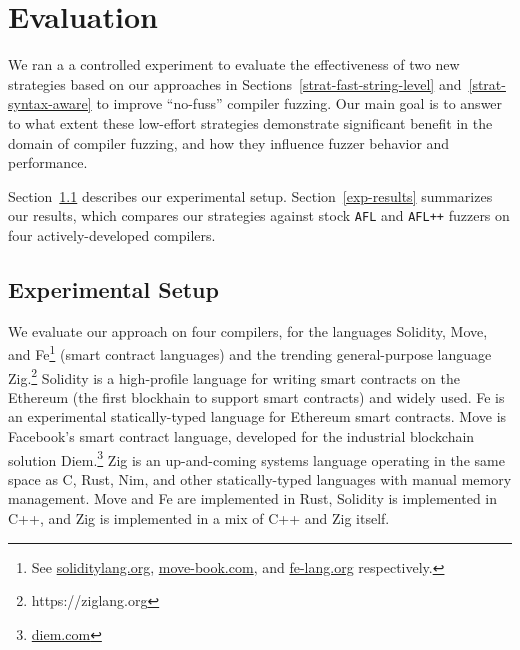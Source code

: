 \section{Evaluation}
\label{eval}

We ran a a controlled experiment to evaluate the effectiveness of two
new strategies based on our approaches in
Sections~\ref{strat-fast-string-level} and~\ref{strat-syntax-aware} to
improve ``no-fuss'' compiler fuzzing. Our main goal is to answer to what
extent these low-effort strategies demonstrate significant benefit in the
domain of compiler fuzzing, and how they influence fuzzer behavior and
performance.

Section~\ref{exp-setup} describes our experimental setup.
Section~\ref{exp-results} summarizes our results, which compares our strategies
against stock \texttt{AFL} and \texttt{AFL++} fuzzers on four actively-developed compilers. 

\subsection{Experimental Setup}
\label{exp-setup}

We evaluate our approach on four compilers, for the languages
Solidity,
Move, and Fe\footnote{See
        \href{https://docs.soliditylang.org}{soliditylang.org},
        \href{https://move-book.com}{move-book.com}, and
        \href{https://fe-lang.org}{fe-lang.org} respectively.}
(smart contract languages) and the trending general-purpose language
Zig.\footnote{https://ziglang.org}
Solidity is a high-profile language for writing smart contracts on the Ethereum
(the first blockhain to support smart contracts) and widely used. Fe
is an experimental statically-typed language for Ethereum smart
contracts. Move is Facebook's smart contract language, developed for the
industrial blockchain solution Diem.\footnote{\href{https://www.diem.com/en-us/}{diem.com}} Zig
is an up-and-coming systems language operating in the same space as C, Rust,
Nim, and other statically-typed languages with manual memory management.
Move and Fe are implemented in Rust, Solidity is implemented in C++, and Zig is
implemented in a mix of C++ and Zig itself. 

